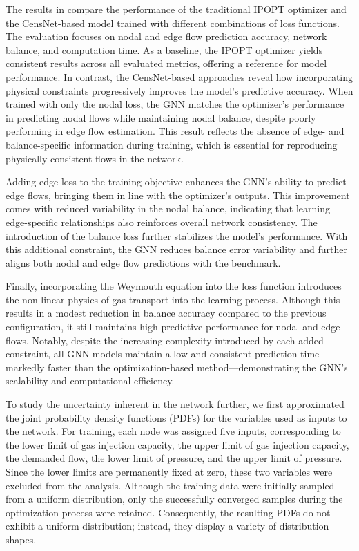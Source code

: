 The results in  compare the performance of the traditional IPOPT optimizer and the CensNet-based model trained with different combinations of loss functions. The evaluation focuses on nodal and edge flow prediction accuracy, network balance, and computation time. As a baseline, the IPOPT optimizer yields consistent results across all evaluated metrics, offering a reference for model performance. In contrast, the CensNet-based approaches reveal how incorporating physical constraints progressively improves the model's predictive accuracy. When trained with only the nodal loss, the GNN matches the optimizer's performance in predicting nodal flows while maintaining nodal balance, despite poorly performing in edge flow estimation. This result reflects the absence of edge- and balance-specific information during training, which is essential for reproducing physically consistent flows in the network.

Adding edge loss to the training objective enhances the GNN’s ability to predict edge flows, bringing them in line with the optimizer’s outputs. This improvement comes with reduced variability in the nodal balance, indicating that learning edge-specific relationships also reinforces overall network consistency. The introduction of the balance loss further stabilizes the model’s performance. With this additional constraint, the GNN reduces balance error variability and further aligns both nodal and edge flow predictions with the benchmark.

Finally, incorporating the Weymouth equation into the loss function introduces the non-linear physics of gas transport into the learning process. Although this results in a modest reduction in balance accuracy compared to the previous configuration, it still maintains high predictive performance for nodal and edge flows. Notably, despite the increasing complexity introduced by each added constraint, all GNN models maintain a low and consistent prediction time—markedly faster than the optimization-based method—demonstrating the GNN’s scalability and computational efficiency.



To study the uncertainty inherent in the network further, we first approximated the joint probability density functions (PDFs) for the variables used as inputs to the network. For training, each node was assigned five inputs, corresponding to the lower limit of gas injection capacity, the upper limit of gas injection capacity, the demanded flow, the lower limit of pressure, and the upper limit of pressure. Since the lower limits are permanently fixed at zero, these two variables were excluded from the analysis. Although the training data were initially sampled from a uniform distribution, only the successfully converged samples during the optimization process were retained. Consequently, the resulting PDFs do not exhibit a uniform distribution; instead, they display a variety of distribution shapes.

